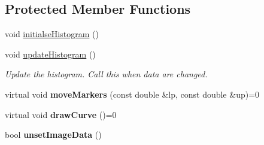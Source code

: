 \subsection*{Protected Member Functions}
\begin{DoxyCompactItemize}
\item 
void \mbox{\hyperlink{classBarScreen_ae652343345f7cc3f7726569c1195ee9a}{initialse\+Histogram}} ()
\item 
\mbox{\label{classBarScreen_a3e9d73bcf97e00634bf7c8b78d2cbad0}} 
void \mbox{\hyperlink{classBarScreen_a3e9d73bcf97e00634bf7c8b78d2cbad0}{update\+Histogram}} ()
\begin{DoxyCompactList}\small\item\em Update the histogram. Call this when data are changed. \end{DoxyCompactList}\item 
\mbox{\label{classBarScreen_a93cc980ebe50e6d0fb5b62e1715cbc10}} 
virtual void {\bfseries move\+Markers} (const double \&lp, const double \&up)=0
\item 
\mbox{\label{classBarScreen_a16448edd7a849d8f64bb1533e42b0c6a}} 
virtual void {\bfseries draw\+Curve} ()=0
\item 
\mbox{\label{classBarScreen_a4d2a43c01c702ce90ffd4433a07d2b73}} 
bool {\bfseries unset\+Image\+Data} ()
\end{DoxyCompactItemize}
